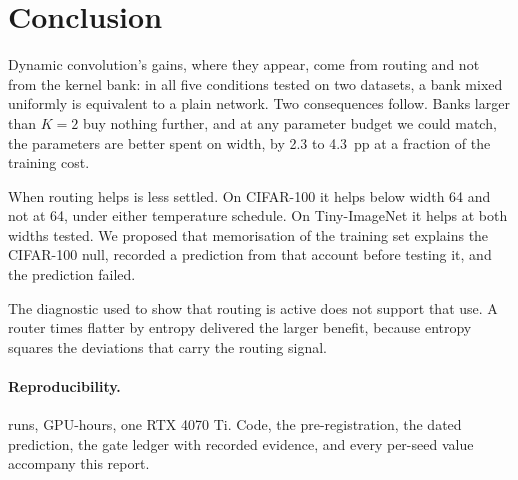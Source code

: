 \documentclass[10pt,a4paper]{article}
\begin{document}
\section{Conclusion}

Dynamic convolution's gains, where they appear, come from routing and not
from the kernel bank: in all five conditions tested on two datasets, a
bank mixed uniformly is equivalent to a plain network. Two consequences
follow. Banks larger than $K=2$ buy nothing further, and at any
parameter budget we could match, the parameters are better spent on
width, by 2.3 to \SI{4.3}{pp} at a fraction of the training cost.

When routing helps is less settled. On CIFAR-100 it helps below width 64
and not at 64, under either temperature schedule. On Tiny-ImageNet it
helps at both widths tested. We proposed that memorisation of the
training set explains the CIFAR-100 null, recorded a prediction from that
account before testing it, and the prediction failed.

The diagnostic used to show that routing is active does not support that
use. A router  times flatter by entropy delivered the larger
benefit, because entropy squares the deviations that carry the routing
signal.

\paragraph{Reproducibility.}  runs,  GPU-hours, one RTX
4070 Ti. Code, the pre-registration, the dated prediction, the gate
ledger with recorded evidence, and every per-seed value accompany this
report.
\end{document}
